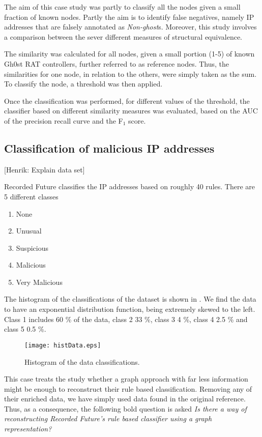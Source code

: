 The aim of this case study was partly to classify all the nodes given a small fraction of known nodes. Partly the aim is to identify false negatives, namely IP addresses that are falsely annotated as \textit{Non-ghost}s. Moreover, this study involves a comparison between the sever different measures of structural equivalence. 

The similarity was calculated for all nodes, given a small portion (1-5) of known Gh0st RAT controllers, further referred to as reference nodes. Thus, the similarities for one node, in relation to the others, were simply taken as the sum. To classify the node, a threshold was then applied. 

Once the classification was performed, for different values of the threshold, the classifier based on different similarity measures was evaluated, based on the AUC of the precision recall curve and the F$_1$ score.

\subsection{Classification of malicious IP addresses}

[Henrik: Explain data set]

Recorded Future classifies the IP addresses based on roughly 40 rules.
There are 5 different classes
\begin{enumerate}
    \item None
    \item Unusual
    \item Suspicious
    \item Malicious
    \item Very Malicious
\end{enumerate}

The histogram of the classifications of the dataset is shown in . We find the data to have an exponential distribution function, being extremely skewed to the left. Class 1 includes 60 \% of the data, class 2 33 \%, class 3 4 \%, class 4 2.5 \% and class 5 0.5 \%. 

\begin{figure}[h!]
    \centering
    \texttt{[image: histData.eps]}
    \caption{Histogram of the data classifications.}
    \label{hist}
\end{figure}

This case treats the study whether a graph approach with far less information might be enough to reconstruct their rule based classification. Removing any of their enriched data, we have simply used data found in the original reference. Thus, as a consequence, the following bold question is asked \textit{Is there a way of reconstructing Recorded Future's rule based classifier using a graph representation?} 

